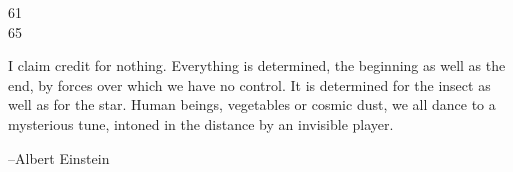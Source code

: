 \documentclass{exam}
\begin{document}
\begin{description}
    \item[61]

    \item[65]
      
  \end{description}
\else
  \vspace{10 cm}

  I claim credit for nothing. Everything is determined, the beginning as well as the end, by forces over which we have no
  control. It is determined for the insect as well as for the star. Human beings, vegetables or cosmic dust, we all dance
  to a mysterious tune, intoned in the distance by an invisible player. 

  \vspace{.2 cm}

  \hspace{1 cm} --Albert Einstein

\fi
\end{document}
